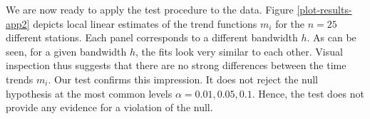 We are now ready to apply the test procedure to the data. Figure \ref{plot-results-app2} depicts local linear estimates of the trend functions $m_i$ for the $n=25$ different stations. Each panel corresponds to a different bandwidth $h$. As can be seen, for a given bandwidth $h$, the fits look very similar to each other. Visual inspection thus suggests that there are no strong differences between the time trends $m_i$. Our test confirms this impression. It does not reject the null hypothesis at the most common levels $\alpha = 0.01, 0.05, 0.1$. Hence, the test does not provide any evidence for a violation of the null. 

